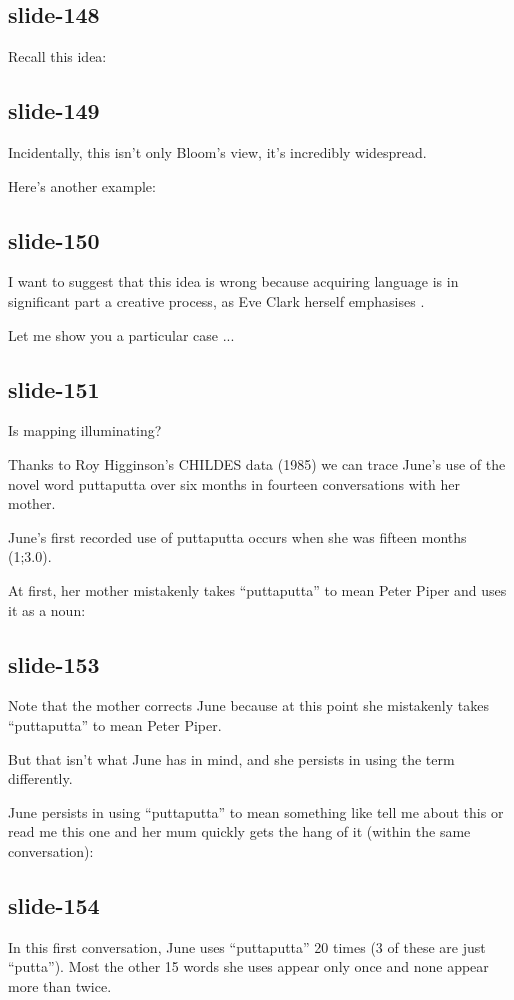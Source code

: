 \documentclass[12pt,\papersize]{extarticle}
\begin{document}
\subsection{slide-148}
Recall this idea:
 
\subsection{slide-149}
Incidentally, this isn't only Bloom's view, it's incredibly widespread.
 
Here's another example:
 
\subsection{slide-150}
I want to suggest that this idea is wrong because acquiring language is in significant part a creative process, as Eve Clark herself emphasises \citep[in][]{Clark:1993bv} .
 
Let me show you a particular case ...
 
\subsection{slide-151}
Is mapping illuminating?
 
Thanks to Roy Higginson's CHILDES data (1985) we can trace June's use of the novel word puttaputta over six months in fourteen conversations with her mother.
 
June's first recorded use of puttaputta occurs when she was fifteen months (1;3.0).
 
At first, her mother mistakenly takes  “puttaputta” to mean Peter Piper and uses it as a noun:
 
\subsection{slide-153}
Note that the mother corrects June because at this point she mistakenly takes  “puttaputta” to mean Peter Piper.
 
But that isn't what June has in mind, and she persists in using the term differently.
 
June persists in using “puttaputta” to mean something like tell me about this or read me this one and her mum quickly gets the hang of it (within the same conversation):
 
\subsection{slide-154}
In this first conversation, June uses “puttaputta” 20 times (3 of these are just “putta”).  Most the other 15 words she uses appear only once and none appear more than twice.
 
\end{document}

